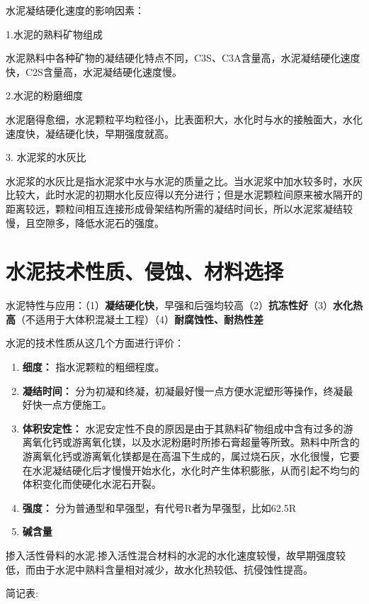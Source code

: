 \documentclass[12pt, a4paper, oneside, UTF8]{ctexbook}
\begin{document}
\begin{remark}
水泥凝结硬化速度的影响因素：

1.水泥的熟料矿物组成

水泥熟料中各种矿物的凝结硬化特点不同，C3S、C3A含量高，水泥凝结硬化速度快，C2S含量高，水泥凝结硬化速度慢。

2.水泥的粉磨细度

水泥磨得愈细，水泥颗粒平均粒径小，比表面积大，水化时与水的接触面大，水化速度快，凝结硬化快，早期强度就高。

3. 水泥浆的水灰比

水泥浆的水灰比是指水泥浆中水与水泥的质量之比。当水泥浆中加水较多时，水灰比较大，此时水泥的初期水化反应得以充分进行；但是水泥颗粒间原来被水隔开的距离较远，颗粒间相互连接形成骨架结构所需的凝结时间长，所以水泥浆凝结较慢，且空隙多，降低水泥石的强度。
\end{remark}

\section{水泥技术性质、侵蚀、材料选择}\label{feature}
水泥特性与应用：（1）\textbf{凝结硬化快}，早强和后强均较高（2）\textbf{抗冻性好}（3）\textbf{水化热高}（不适用于大体积混凝土工程）（4）\textbf{耐腐蚀性、耐热性差}

水泥的技术性质从这几个方面进行评价：
\begin{enumerate}
	\item \textbf{细度：}
	指水泥颗粒的粗细程度。
	\item \textbf{凝结时间：}
	分为初凝和终凝，初凝最好慢一点方便水泥塑形等操作，终凝最好快一点方便施工。
	\item \textbf{体积安定性：}
	水泥安定性不良的原因是由于其熟料矿物组成中含有过多的游离氧化钙或游离氧化镁，以及水泥粉磨时所掺石膏超量等所致。熟料中所含的游离氧化钙或游离氧化镁都是在高温下生成的，属过烧石灰，水化很慢，它要在水泥凝结硬化后才慢慢开始水化，水化时产生体积膨胀，从而引起不均匀的体积变化而使硬化水泥石开裂。
	\item \textbf{强度：}
	分为普通型和早强型，有代号R者为早强型，比如62.5R
	\item \textbf{碱含量}
\end{enumerate}

掺入活性骨料的水泥:掺入活性混合材料的水泥的水化速度较慢，故早期强度较低，而由于水泥中熟料含量相对减少，故水化热较低、抗侵蚀性提高。

简记表:
\end{document}
